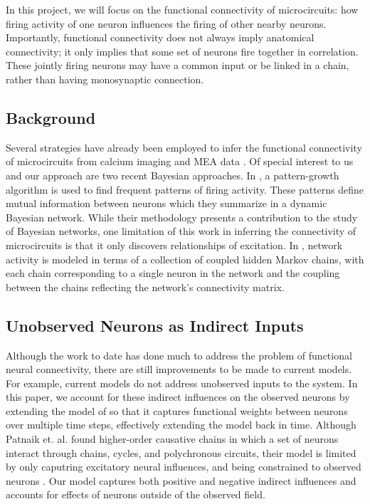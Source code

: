 \documentclass{article}
\begin{document}
In this project, we will focus on the functional connectivity of
microcircuits: how firing activity of one neuron influences the
firing of other nearby neurons.  Importantly, functional connectivity
does not always imply anatomical connectivity; it only implies that
some set of neurons fire together in correlation.  These jointly
firing neurons may have a common input or be linked in a chain,
rather than having monosynaptic connection.

\subsection{Background}

Several strategies have already been employed to infer the functional
connectivity of microcircuits from calcium imaging and MEA data
\citep{Gerwinn2010, takahashi2007, aguiar2009}. Of special interest
to us and our approach are two recent Bayesian approaches. In
\citep{patnaik2011}, a pattern-growth algorithm is used to find
frequent patterns of firing activity. These patterns define mutual
information between neurons which they summarize in a dynamic
Bayesian network. While their methodology presents a contribution
to the study of Bayesian networks, one limitation of this work in
inferring the connectivity of microcircuits is that it only discovers
relationships of excitation. In \citep{mishchencko2011}, network
activity is modeled in terms of a collection of coupled hidden
Markov chains, with each chain corresponding to a single neuron in
the network and the coupling between the chains reflecting the
network’s connectivity matrix. 

\subsection{Unobserved Neurons as Indirect Inputs}

Although the work to date has done much to address the problem of
functional neural connectivity, there are still improvements to be
made to current models. For example, current models do not address
unobserved inputs to the system. In this paper, we account for these indirect influences on the
observed neurons by extending the model of \citep{mishchencko2011}
so that it captures functional weights between neurons over multiple
time steps, effectively extending the model back in time. Although Patnaik
et.  al. found higher-order causative chains in which a set of
neurons interact through chains, cycles,
and polychronous circuits, their model is
limited by only caputring excitatory neural influences, and being
constrained to observed neurons  \citep{patnaik2011}.  Our model captures both positive
and negative indirect influences and accounts for effects of neurons
outside of the observed field.
\end{document}
